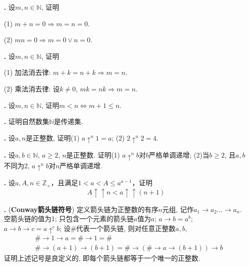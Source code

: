 \par \textbf{\theprobset .} 设$m,n\in \mathbb{N}$, 证明
\par (1) $m+n=0\Rightarrow m=n=0$.
\par (2) $mn=0 \Rightarrow m=0\lor n=0$. 

\par \textbf{\theprobset .} 设$m,n\in \mathbb{N}$, 证明
\par (1) 加法消去律: $m+k=n+k\Rightarrow m=n$. 
\par (2) 乘法消去律: 设$k\neq 0$, $mk=nk \Rightarrow m=n$. 

\par \textbf{\theprobset .} 设$m,n\in \mathbb{N}$, 证明$m<n\iff m+1\le n$.

\par \textbf{\theprobset .} \cite{NST} 证明自然数集$\mathbb{N}$是传递集. 

\par \textbf{\theprobset .} 设$a,n$是正整数, 证明(1) $a\uparrow^n 1=a$; (2) $2\uparrow^n 2=4$. 

\par \textbf{\theprobset .} 设$a,b\in \mathbb{N}$, $a\ge 2$, $n$是正整数. 证明(1) $a\uparrow^n b$对$b$严格单调递增; (2)当$b\ge 2$, 且$a,b$不同为2, $a\uparrow^n b$对$n$严格单调递增. 

\par \textbf{\theprobset .} \cite{RBN} 设$a, A, n \in \mathbb{Z}_+$，且满足$1<a<A\le a^{a-1}$，证明
\begin{equation}
    A\uparrow \uparrow n < a \uparrow \uparrow (n+1)
\end{equation}

\par \textbf{\theprobset .} (\textbf{Conway箭头链符号}) 定义箭头链为正整数的有序$n$元组, 记作$a_1\rightarrow a_2\dots \rightarrow a_n$. 空箭头链的值为1; 只包含一个元素的箭头链$a$值为$a$; $a\rightarrow b=a^b$; $a\rightarrow b\rightarrow c=a\uparrow^c b$; 设$\#$代表一个箭头链, 则对任意正整数$a,b$, 
\begin{align}
    &\#\rightarrow 1 \rightarrow a=\#\rightarrow 1=\#\\
    &\#\rightarrow (a+1) \rightarrow (b+1)=\#\rightarrow (\#\rightarrow a \rightarrow (b+1)) \rightarrow b
\end{align}
证明上述记号是良定义的, 即每个箭头链都等于一个唯一的正整数. 

